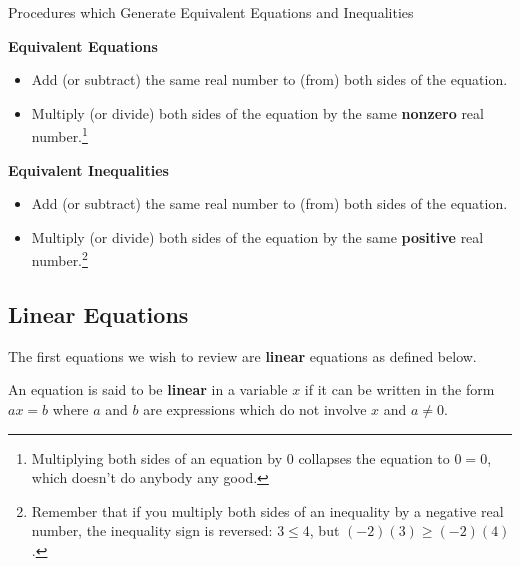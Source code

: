 \begin{floatbox}[label=box:equivalenteqnineq]{Procedures which Generate Equivalent Equations and Inequalities}

\textbf{Equivalent Equations}
\begin{itemize}

\item  Add (or subtract) the same real number to (from) both sides of the equation.

\item  Multiply (or divide) both sides of the equation by the same \textbf{nonzero} real number.\footnote{Multiplying both sides of an equation by $0$ collapses the equation to $0 = 0$, which doesn't do anybody any good.}

\end{itemize}

\textbf{Equivalent Inequalities}

\begin{itemize}

\item  Add (or subtract) the same real number to (from) both sides of the equation.

\item  Multiply (or divide) both sides of the equation by the same \textbf{positive} real number.\footnote{Remember that if you multiply both sides of an inequality by a negative real number, the inequality sign is reversed:  $3 \leq 4$, but $(-2)(3) \geq (-2)(4)$.}

\end{itemize}

\end{floatbox}

\subsection{Linear Equations} \label{LinearEqn}

The first equations we wish to review are \textbf{linear} equations as defined below.

\begin{tcolorbox}
	
\begin{defn}\label{lineareqndefn} An equation is said to be \textbf{linear} in a variable $x$ if it can be written in the form $ax = b$ where $a$ and $b$ are expressions which do not involve $x$ and $a \neq 0$.

\end{defn}

\end{tcolorbox}

